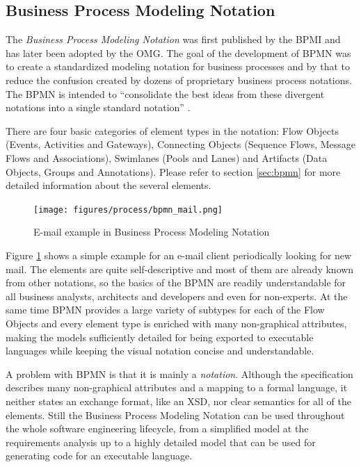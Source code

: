\subsection{Business Process Modeling Notation}
\label{sec:bpmn_short}

The \emph{Business Process Modeling Notation} was first published by the BPMI
and has later been adopted by the OMG. The goal of the development of BPMN was to create a standardized modeling notation for business processes and by that to reduce the confusion created by dozens of proprietary business process notations. The BPMN is intended to ``consolidate the best ideas from these divergent notations into a single standard notation'' \cite[p. 9]{white04}.

There are four basic categories of element types in the notation: Flow Objects (Events, Activities  and Gateways), Connecting Objects (Sequence Flows, Message Flows and Associations), Swimlanes (Pools and Lanes) and Artifacts (Data Objects, Groups and Annotations). Please refer to section \ref{sec:bpmn} for more detailed information about the several elements.

\begin{figure}[htp]
	\centering
	\texttt{[image: figures/process/bpmn\_mail.png]}
	\caption{E-mail example in Business Process Modeling Notation}
	\label{fig:bpmn-mail}
\end{figure}

Figure \ref{fig:bpmn-mail} shows a simple example for an e-mail client periodically looking for new mail. The elements are quite self-descriptive and most of them are already known from other notations, so the basics of the BPMN are readily understandable for all business analysts, architects and developers and even for non-experts. At the same time BPMN provides a large variety of subtypes for each of the Flow Objects and every element type is enriched with many non-graphical attributes, making the models sufficiently detailed for being exported to executable languages while keeping the visual notation concise and understandable.

A problem with BPMN is that it is mainly a \emph{notation}. Although the specification describes many non-graphical attributes and a mapping to a formal language, it neither states an exchange format, like an XSD, nor clear semantics for all of the elements. Still the Business Process Modeling Notation can be used throughout the whole software engineering lifecycle, from a simplified model at the requirements analysis up to a highly detailed model that can be used for generating code for an executable language.


